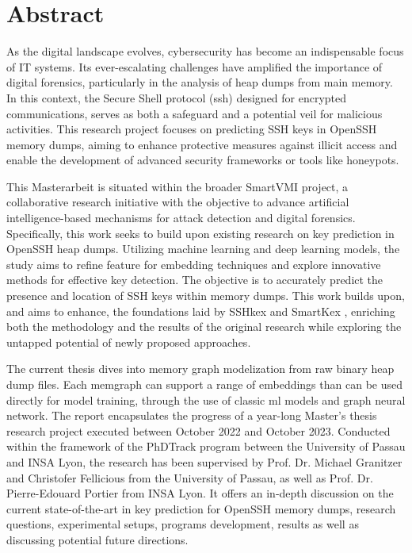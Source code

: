 \documentclass[11pt]{book} %
\title{\thetitle}
\author{\theauthor}
\date{April-Mai 2023}
\begin{document}

\newpage


\section*{Abstract}
As the digital landscape evolves, cybersecurity has become an indispensable focus of IT systems. Its ever-escalating challenges have amplified the importance of digital forensics, particularly in the analysis of heap dumps from main memory. In this context, the Secure Shell protocol (\acrshort{ssh}) designed for encrypted communications, serves as both a safeguard and a potential veil for malicious activities. This research project focuses on predicting SSH keys in OpenSSH memory dumps, aiming to enhance protective measures against illicit access and enable the development of advanced security frameworks or tools like honeypots. 

This Masterarbeit is situated within the broader SmartVMI project, a collaborative research initiative with the objective to advance artificial intelligence-based mechanisms for attack detection and digital forensics. Specifically, this work seeks to build upon existing research on key prediction in OpenSSH heap dumps. Utilizing machine learning and deep learning models, the study aims to refine feature for embedding techniques and explore innovative methods for effective key detection. The objective is to accurately predict the presence and location of SSH keys within memory dumps. This work builds upon, and aims to enhance, the foundations laid by SSHkex \cite{SSHkex22} and SmartKex \cite{SmartKex22}, enriching both the methodology and the results of the original research while exploring the untapped potential of newly proposed approaches.

The current thesis dives into memory graph modelization from raw binary heap dump files. Each \gls{memgraph} can support a range of embeddings than can be used directly for model training, through the use of classic \acrshort{ml} models and graph neural network. The report encapsulates the progress of a year-long Master's thesis research project executed between October 2022 and October 2023. Conducted within the framework of the PhDTrack program between the University of Passau and INSA Lyon, the research has been supervised by Prof. Dr. Michael Granitzer and Christofer Fellicious from the University of Passau, as well as Prof. Dr. Pierre-Edouard Portier from INSA Lyon. It offers an in-depth discussion on the current state-of-the-art in key prediction for OpenSSH memory dumps, research questions, experimental setups, programs development, results as well as discussing potential future directions.
\end{document}
